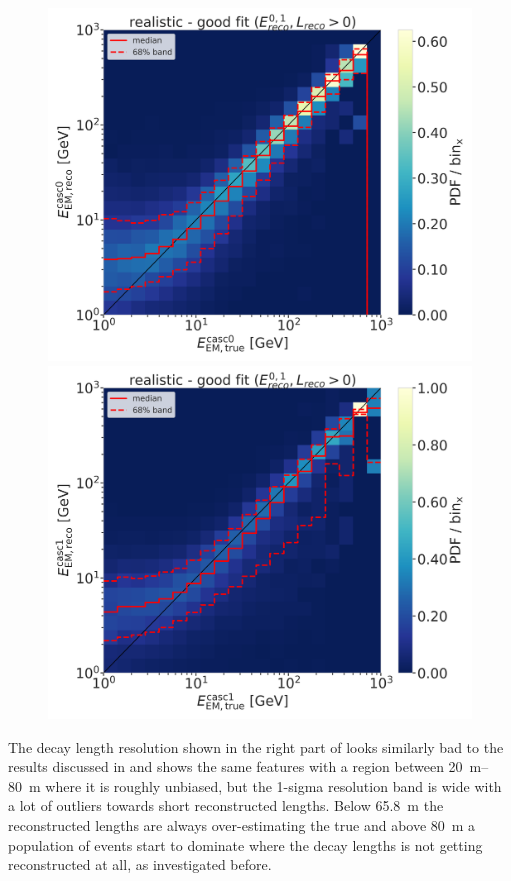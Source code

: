 \begin{figure}[h]
    \centering
    \includegraphics[width=0.49\linewidth]{figures/model_independent_simulation/results/realistic/2d_hists/194603_casc0_reco_energy_vs_casc0_true_energy_goodfit_step_contours.png}
    \includegraphics[width=0.49\linewidth]{figures/model_independent_simulation/results/realistic/2d_hists/194603_casc1_reco_energy_vs_casc1_true_energy_goodfit_step_contours.png}
    \caption[]{}
\end{figure}

The decay length resolution shown in the right part of  looks similarly bad to the results discussed in  and shows the same features with a region between \SIrange[range-phrase={~and~}]{20}{80}{\meter} where it is roughly unbiased, but the 1-sigma resolution band is wide with a lot of outliers towards short reconstructed lengths. Below \SI{65.8}{\meter} the reconstructed lengths are always over-estimating the true and above \SI{80}{\meter} a population of events start to dominate where the decay lengths is not getting reconstructed at all, as investigated before.

